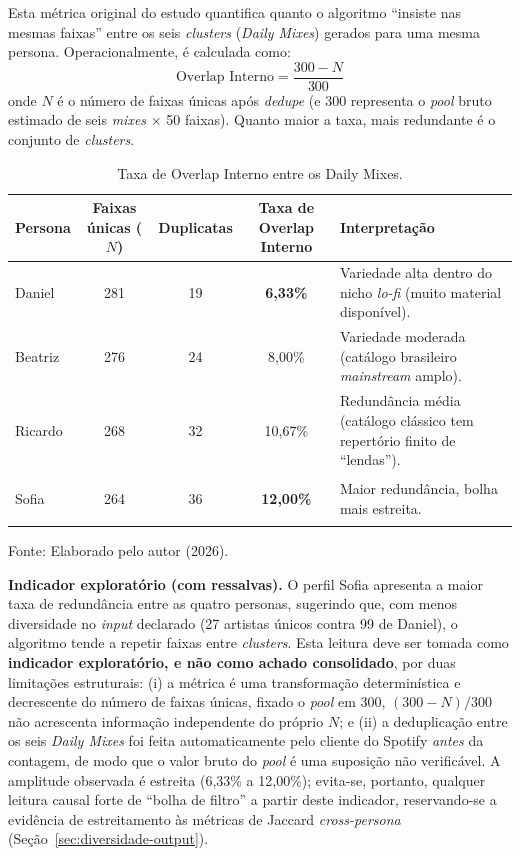 \documentclass[12pt, %
openright,
oneside, %
a4paper,    %
english,   %
brazil]{facom-ufu-abntex2}
\newcommand{\fontefig}[1]{%
  \par\nopagebreak\vspace{0.15cm}%
  {\centering\footnotesize Fonte: #1\par}%
}
\begin{document}
Esta métrica original do estudo quantifica quanto o algoritmo ``insiste nas
mesmas faixas'' entre os seis \emph{clusters} (\emph{Daily Mixes}) gerados para
uma mesma persona. Operacionalmente, é calculada como:
\[ \text{Overlap Interno} = \frac{300 - N}{300} \]
onde $N$ é o número de faixas únicas após \emph{dedupe} (e 300 representa o
\emph{pool} bruto estimado de seis \emph{mixes} $\times$ 50 faixas). Quanto maior
a taxa, mais redundante é o conjunto de \emph{clusters}.

\begin{table}[H]
\centering
\caption{Taxa de Overlap Interno entre os Daily Mixes.}
\label{tab:overlap}
\footnotesize
\begin{tabularx}{\textwidth}{>{\bfseries\raggedright\arraybackslash}p{1.7cm} c c c X}
\toprule
\textbf{Persona} & \textbf{Faixas únicas ($N$)} & \textbf{Duplicatas} & \textbf{Taxa de Overlap Interno} & \textbf{Interpretação} \\
\midrule
Daniel  & 281 & 19 & \textbf{6,33\%}  & Variedade alta dentro do nicho \emph{lo-fi} (muito material disponível). \\
Beatriz & 276 & 24 & 8,00\%  & Variedade moderada (catálogo brasileiro \emph{mainstream} amplo). \\
Ricardo & 268 & 32 & 10,67\% & Redundância média (catálogo clássico tem repertório finito de ``lendas''). \\
Sofia   & 264 & 36 & \textbf{12,00\%} & Maior redundância, bolha mais estreita. \\
\bottomrule
\end{tabularx}
\fontefig{Elaborado pelo autor (2026).}
\end{table}

\textbf{Indicador exploratório (com ressalvas).} O perfil Sofia apresenta a maior
taxa de redundância entre as quatro personas, sugerindo que, com menos
diversidade no \emph{input} declarado (27 artistas únicos contra 99 de Daniel), o
algoritmo tende a repetir faixas entre \emph{clusters}. Esta leitura deve ser
tomada como \textbf{indicador exploratório, e não como achado consolidado}, por
duas limitações estruturais: (i) a métrica é uma transformação determinística e
decrescente do número de faixas únicas, fixado o \emph{pool} em 300,
$(300-N)/300$ não acrescenta informação independente do próprio $N$; e (ii) a
deduplicação entre os seis \emph{Daily Mixes} foi feita automaticamente pelo
cliente do Spotify \emph{antes} da contagem, de modo que o valor bruto do
\emph{pool} é uma suposição não verificável. A amplitude observada é estreita
(6,33\% a 12,00\%); evita-se, portanto, qualquer leitura causal forte de ``bolha
de filtro'' a partir deste indicador, reservando-se a evidência de estreitamento
às métricas de Jaccard \emph{cross-persona} (Seção~\ref{sec:diversidade-output}).
\end{document}
